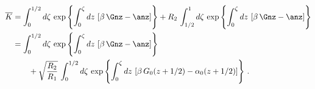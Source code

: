 
\begin{equation}
    \begin{split}
        \overline{K} &= \int_{0}^{1/2} d \zeta\, \exp\left\{\int_{0}^{\zeta} d z\, \left[\beta\, \Gnz - \anz\right] \right\} + R_2\, \int_{1/2}^{1} d \zeta\, \exp\left\{\int_{0}^{\zeta} d z\, \left[\beta\, \Gnz - \anz\right] \right\}\\
        &= \int_{0}^{1/2} d \zeta\, \exp\left\{\int_{0}^{\zeta} d z\, \left[\beta\, \Gnz - \anz\right] \right\} \\
        &\qquad + \sqrt{\frac{R_2}{R_1}}\, \int_{0}^{1/2} d \zeta\, \exp\left\{\int_{0}^{\zeta} d z\, \left[\beta\, G_0(z + 1/2) - \alpha_0(z + 1/2)\right] \right\} \, .
    \end{split}
\end{equation}

